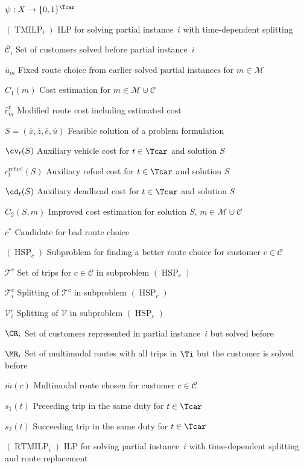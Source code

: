 \begin{labeling}{$\psi:X\to\{0,1\}^{\Tcar}$}
	\item[$(\operatorname{TMILP}_i)$]{ILP for solving partial instance~$i$ with time-dependent splitting}
	\item[$\overline{\mathcal{C}}_i$]{Set of customers solved before partial instance~$i$}
	\item[$\bar{u}_m$]{Fixed route choice from earlier solved partial instances for $m\in\mathcal{M}$}
	\item[$C_1(m)$]{Cost estimation for $m\in\mathcal{M}\cupdot\mathcal{C}$}
	\item[$\hat{c}^{\operatorname{r}}_m$]{Modified route cost including estimated cost}
	\item[$S=\left(\bar{x},\bar{z},\bar{e},\bar{u}\right)$]{Feasible solution of a problem formulation}
	\item[$\cv_t(S)$]{Auxiliary vehicle cost for $t\in\Tcar$ and solution $S$}
	\item[$c^{\operatorname{refuel}}_t(S)$]{Auxiliary refuel cost for $t\in\Tcar$ and solution $S$}
	\item[$\cd_t(S)$]{Auxiliary deadhead cost for $t\in\Tcar$ and solution $S$}
	\item[$C_2(S,m)$]{Improved cost estimation for solution $S$, $m\in\mathcal{M}\cupdot\mathcal{C}$}
	\item[$c^*$]{Candidate for bad route choice}
	\item[$(\operatorname{HSP}_c)$]{Subproblem for finding a better route choice for customer $c\in\mathcal{C}$}
	\item[$\mathcal{T}^c$]{Set of trips for $c\in\mathcal{C}$ in subproblem $(\operatorname{HSP}_c)$}
	\item[$\mathcal{T}^c_i$]{Splitting of $\mathcal{T}^c$ in subproblem $(\operatorname{HSP}_c)$}
	\item[$\mathcal{V}^c_i$]{Splitting of $\mathcal{V}$ in subproblem $(\operatorname{HSP}_c)$}
	\item[$\CR_i$]{Set of customers represented in partial instance~$i$ but solved before}
	\item[$\MR_i$]{Set of multimodal routes with all trips in $\Ti$ but the customer is solved before}
	\item[$\bar{m}(c)$]{Multimodal route chosen for customer $c\in\mathcal{C}$}
	\item[$s_1(t)$]{Preceding trip in the same duty for $t\in\Tcar$}
	\item[$s_2(t)$]{Succeeding trip in the same duty for $t\in\Tcar$}
	\item[$(\operatorname{RTMILP}_i)$]{ILP for solving partial instance~$i$ with time-dependent splitting and route replacement}

\end{labeling}
